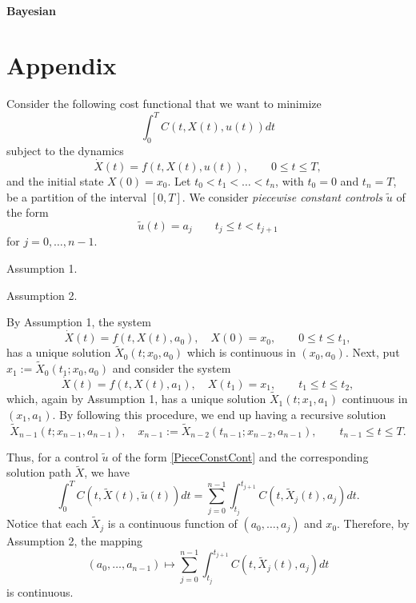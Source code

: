 \documentclass[a4paper,10pt, 5p]{elsarticle}
\begin{document}
    \paragraph{Bayesian}


    \section{Appendix}

Consider the following cost functional that we want to minimize
  \begin{equation}\label{costFunctional}
  \int_0^T C(t,X(t),u(t)) dt
  \end{equation}
subject to the dynamics
  \begin{equation}\label{dynamics}
  \dot{X}(t) = f(t,X(t),u(t)),  \qquad    0\leq t \leq T,
  \end{equation}
and the initial state $X(0)=x_0$. Let $t_0<t_1<\ldots <t_n$, with $t_0=0$ and $t_n=T$, be a partition of the interval $[0,T]$. We consider {\it piecewise constant controls} $\tilde{u}$ of the form
         \begin{equation}\label{PieceConstCont}
  \tilde{u}(t) = a_j\qquad t_j\leq t < t_{j+1}
         \end{equation}
 for $j=0,\ldots,n-1$.

{\sc Assumption 1}.


{\sc Assumption 2}.

By Assumption 1, the system
    \[    \dot{X}(t) = f(t,X(t),a_0), \quad X(0)=x_0, \qquad    0\leq t \leq t_1,
  \]
has a unique solution $\tilde{X}_0(t;x_0,a_0)$ which is continuous in $(x_0,a_0)$.  Next, put $x_1:=\tilde{X}_0(t_1;x_0,a_0)$ and consider the system
    \[    \dot{X}(t) = f(t,X(t),a_1), \quad X(t_1)=x_1, \qquad    t_1\leq t \leq t_2,
  \]
which, again by Assumption 1, has a unique solution $\tilde{X}_1(t;x_1,a_1)$ continuous in $(x_1,a_1)$. By following this procedure, we end up having a recursive solution
	\[  \tilde{X}_{n-1}(t;x_{n-1},a_{n-1}),\quad   x_{n-1}:=\tilde{X}_{n-2}(t_{n-1};x_{n-2},a_{n-1}),     \qquad    t_{n-1}\leq t \leq T. \]

Thus, for a control $\tilde{u}$ of the form \eqref{PieceConstCont} and the corresponding solution path $\tilde{X}$, we have
	\[
	\int_0^T C(t,\tilde{X}(t),\tilde{u}(t)) dt   =     \sum_{j=0}^{n-1}   \int_{t_j}^{t_{j+1}} C(t,\tilde{X}_j(t),a_j) dt.
	\]
Notice that each $\tilde{X}_j$ is a continuous function of $(a_0,\ldots,a_j)$	 and $x_0$. Therefore, by Assumption 2, the mapping
		\[
		(a_0,\ldots,a_{n-1}) \mapsto  \sum_{j=0}^{n-1}   \int_{t_j}^{t_{j+1}} C(t,\tilde{X}_j(t),a_j) dt
		\]
is continuous.

    \nocite{*}
    
    
\end{document}
